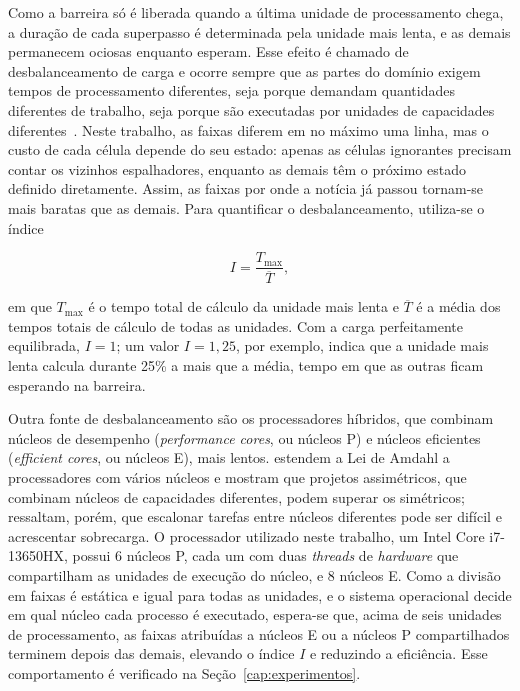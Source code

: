 Como a barreira só é liberada quando a última unidade de processamento chega, a duração de cada superpasso é determinada pela unidade mais lenta, e as demais permanecem ociosas enquanto esperam. Esse efeito é chamado de desbalanceamento de carga e ocorre sempre que as partes do domínio exigem tempos de processamento diferentes, seja porque demandam quantidades diferentes de trabalho, seja porque são executadas por unidades de capacidades diferentes~\cite{Foster1995}. Neste trabalho, as faixas diferem em no máximo uma linha, mas o custo de cada célula depende do seu estado: apenas as células ignorantes precisam contar os vizinhos espalhadores, enquanto as demais têm o próximo estado definido diretamente. Assim, as faixas por onde a notícia já passou tornam-se mais baratas que as demais. Para quantificar o desbalanceamento, utiliza-se o índice

\begin{equation}\label{eq:desbalanceamento}
    I = \frac{T_{\max}}{\overline{T}},
\end{equation}

\noindent em que $T_{\max}$ é o tempo total de cálculo da unidade mais lenta e $\overline{T}$ é a média dos tempos totais de cálculo de todas as unidades. Com a carga perfeitamente equilibrada, $I = 1$; um valor $I = 1{,}25$, por exemplo, indica que a unidade mais lenta calcula durante 25\% a mais que a média, tempo em que as outras ficam esperando na barreira.

Outra fonte de desbalanceamento são os processadores híbridos, que combinam núcleos de desempenho (\textit{performance cores}, ou núcleos P) e núcleos eficientes (\textit{efficient cores}, ou núcleos E), mais lentos.  estendem a Lei de Amdahl a processadores com vários núcleos e mostram que projetos assimétricos, que combinam núcleos de capacidades diferentes, podem superar os simétricos; ressaltam, porém, que escalonar tarefas entre núcleos diferentes pode ser difícil e acrescentar sobrecarga. O processador utilizado neste trabalho, um Intel Core i7-13650HX, possui 6 núcleos P, cada um com duas \textit{threads} de \textit{hardware} que compartilham as unidades de execução do núcleo, e 8 núcleos E. Como a divisão em faixas é estática e igual para todas as unidades, e o sistema operacional decide em qual núcleo cada processo é executado, espera-se que, acima de seis unidades de processamento, as faixas atribuídas a núcleos E ou a núcleos P compartilhados terminem depois das demais, elevando o índice $I$ e reduzindo a eficiência. Esse comportamento é verificado na Seção~\ref{cap:experimentos}.

